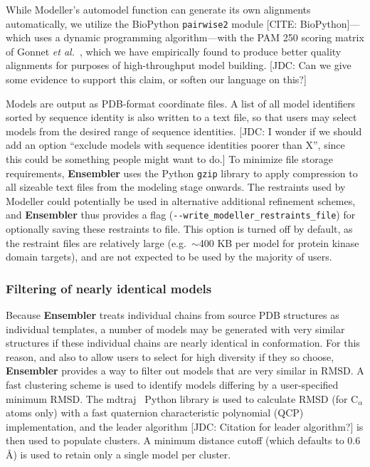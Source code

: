 \documentclass[aps,pre,twocolumn,nofootinbib,superscriptaddress,linenumbers]{revtex4-1}
\begin{document}
While Modeller's automodel function can generate its own alignments automatically, we utilize the BioPython {\tt pairwise2} module {\color{red}[CITE: BioPython]}---which uses a dynamic programming algorithm---with the PAM 250 scoring matrix of Gonnet \textit{et al.}~\cite{gonnet:science:1992:exhaustive-matching}, which we have empirically found to produce better quality alignments for purposes of high-throughput model building.
{\color{red}[JDC: Can we give some evidence to support this claim, or soften our language on this?]}

Models are output as PDB-format coordinate files.
A list of all model identifiers sorted by sequence identity is also written to a text file, so that users may select models from the desired range of sequence identities.
{\color{red}[JDC: I wonder if we should add an option ``exclude models with sequence identities poorer than X'', since this could be something people might want to do.]}
To minimize file storage requirements, {\bf Ensembler} uses the Python {\tt gzip} library to apply compression to all sizeable text files from the modeling stage onwards.
The restraints used by Modeller could potentially be used in alternative additional refinement schemes, and {\bf Ensembler} thus provides a flag ({\tt -{}-write\_modeller\_restraints\_file}) for optionally saving these restraints to file.
This option is turned off by default, as the restraint files are relatively large (e.g.~$\sim$400 KB per model for protein kinase domain targets), and are not expected to be used by the majority of users.

\subsubsection*{Filtering of nearly identical models}

Because {\bf Ensembler} treats individual chains from source PDB structures as individual templates, a number of models may be generated with very similar structures if these individual chains are nearly identical in conformation.
For this reason, and also to allow users to select for high diversity if they so choose, {\bf Ensembler} provides a way to filter out models that are very similar in RMSD.
A fast clustering scheme is used to identify models differing by a user-specified minimum RMSD.
The mdtraj~\cite{mdtraj} Python library is used to calculate RMSD (for C$_\alpha$ atoms only) with a fast quaternion characteristic polynomial (QCP)~\cite{theobald:acta-cryst-a:2005:qcp,theobald:j-comput-chem:2010:qcp,theobald:j-comput-chem:2011:qcp} implementation, and the leader algorithm {\color{red}[JDC: Citation for leader algorithm?]} is then used to populate clusters.
A minimum distance cutoff (which defaults to 0.6 \AA) is used to retain only a single model per cluster.
\end{document}
